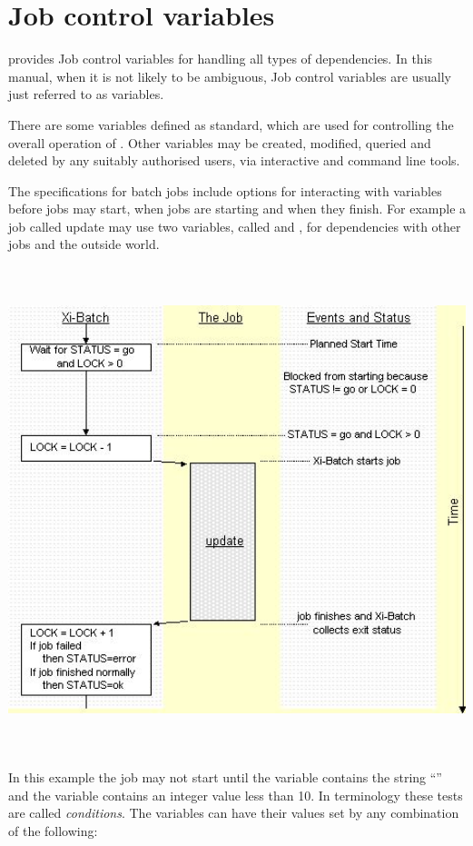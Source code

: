 \chapter{Job control variables}
\label{chp:job-control-variables}
\ProductName{} provides Job control variables for handling all types of dependencies. In this manual, when it is not likely to be ambiguous,
Job control variables are usually just referred to as variables.

There are some variables defined as standard, which are used for controlling the overall operation of \ProductName{}. Other variables may be
created, modified, queried and deleted by any suitably authorised users, via interactive and command line tools.

The specifications for batch jobs include options for interacting with variables before jobs may start, when jobs are starting and when they
finish. For example a job called update may use two variables, called  and , for
dependencies with other jobs and the outside world.

 \includegraphics[width=16.925cm,height=14.146cm]{img/ref5.jpg} 

In this example the job  may not start until the variable  contains the string
``'' and the variable  contains an integer value less than 10.
In \ProductName{} terminology these tests are called \textit{conditions}. The variables can have their values set by any
combination of the following:

